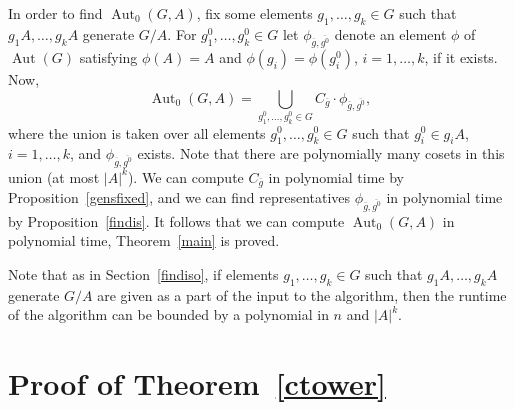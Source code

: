 \documentclass{article}
\DeclareMathOperator{\Aut}{Aut}
\begin{document}
In order to find \( \Aut_0(G, A) \), fix some elements \( g_1, \dots, g_k \in G \) such that \( g_1A, \dots, g_kA \) generate \( G/A \).
For \( g^0_1, \dots, g^0_k \in G \) let \( \phi_{\overline{g}, \overline{g^0}} \)
denote an element \( \phi \) of \( \Aut(G) \) satisfying \( \phi(A) = A \) and \( \phi(g_i) = \phi(g^0_i) \), \( i = 1, \dots, k \), if it exists.
Now,
\[ \Aut_0(G, A) = \bigcup_{g^0_1, \dots, g^0_k \in G} C_{\overline{g}} \cdot \phi_{\overline{g}, \overline{g^0}}, \]
where the union is taken over all elements \( g^0_1, \dots, g^0_k \in G \) such that \( g^0_i \in g_iA \), \( i = 1, \dots, k \),
and \( \phi_{\overline{g}, \overline{g^0}} \) exists. Note that there are polynomially many cosets in this union (at most \( |A|^k \)).
We can compute \( C_{\overline{g}} \) in polynomial time by Proposition~\ref{gensfixed}, and we can find representatives
\( \phi_{\overline{g}, \overline{g^0}} \) in polynomial time by Proposition~\ref{findis}.
It follows that we can compute \( \Aut_0(G, A) \) in polynomial time, Theorem~\ref{main} is proved.

Note that as in Section~\ref{findiso}, if elements \( g_1, \dots, g_k \in G \) such that \( g_1A, \dots, g_kA \) generate \( G/A \)
are given as a part of the input to the algorithm, then the runtime of the algorithm can be bounded by a polynomial in \( n \) and \( |A|^k \).

\section{Proof of Theorem~\ref{ctower}}\label{stower}
\end{document}
